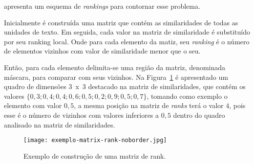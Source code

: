 apresenta um esquema de \textit{rankings} para contornar esse problema.


%





Inicialmente é construída uma matriz que contém as similaridades de todas as unidades de texto. Em seguida, cada valor na matriz de similaridade é substituído por seu ranking local. Onde para cada elemento da matiz, seu \textit{ranking} é o número de elementos vizinhos com valor de similaridade menor que o seu.%

Então, para cada elemento delimita-se uma região da matriz, denominada máscara, para comparar com seus vizinhos.
%
Na Figura~\ref{fig:exemplomatrixrank} é apresentado um quadro de dimensões 3~x~3 destacado na matriz de similaridades, que contém os valores  $\{0,3; 0,4; 0,4; 0,6; 0,5; 0,2; 0,9; 0,5; 0,7\}$, tomando como exemplo o elemento com valor $0,5$, a mesma posição na matriz de \textit{ranks} terá o valor $4$, pois esse é o número de vizinhos com valores inferiores a $0,5$ dentro do quadro analisado na matriz de similaridades. 








  \begin{figure}[!h]

	\centering
	\texttt{[image: exemplo-matrix-rank-noborder.jpg]}
	\caption{Exemplo de construção de uma matriz de rank.~\cite{Choi2000}}
	\label{fig:exemplomatrixrank}

  \end{figure}






